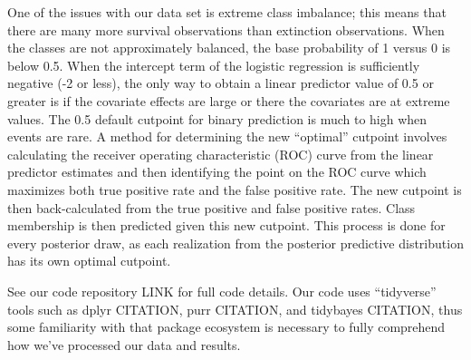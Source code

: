 \documentclass[12pt,letterpaper]{article}
\begin{document}
One of the issues with our data set is extreme class imbalance; this means that there are many more survival observations than extinction observations. When the classes are not approximately balanced, the base probability of 1 versus 0 is below 0.5. When the intercept term of the logistic regression is sufficiently negative (-2 or less), the only way to obtain a linear predictor value of 0.5 or greater is if the covariate effects are large or there the covariates are at extreme values. The 0.5 default cutpoint for binary prediction is much to high when events are rare. A method for determining the new ``optimal'' cutpoint involves calculating the receiver operating characteristic (ROC) curve from the linear predictor estimates and then identifying the point on the ROC curve which maximizes both true positive rate and the false positive rate. The new cutpoint is then back-calculated from the true positive and false positive rates. Class membership is then predicted given this new cutpoint. This process is done for every posterior draw, as each realization from the posterior predictive distribution has its own optimal cutpoint.

%
%
%
%
%
%



See our code repository LINK for full code details. Our code uses ``tidyverse'' tools such as dplyr CITATION, purr CITATION, and tidybayes CITATION, thus some familiarity with that package ecosystem is necessary to fully comprehend how we've processed our data and results.
\end{document}
